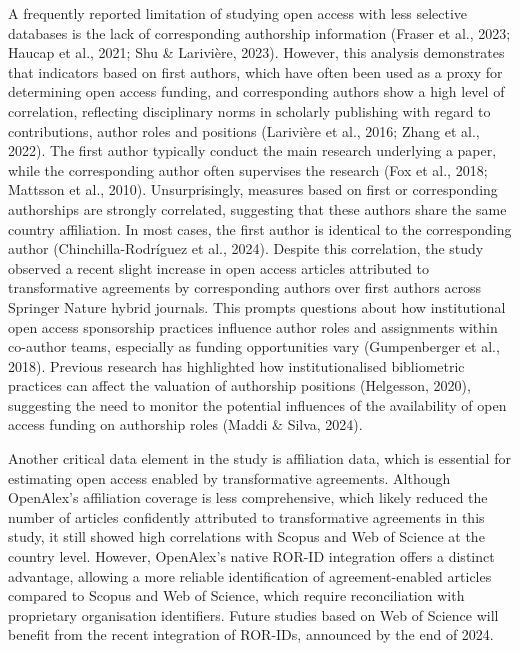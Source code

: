 \documentclass[a4paper,man,floatsintext,longtable,noextraspace,10pt]{apa6}
\begin{document}
A frequently reported limitation of studying open access with less
selective databases is the lack of corresponding authorship information
(Fraser et al., 2023; Haucap et al., 2021; Shu \& Larivière, 2023).
However, this analysis demonstrates that indicators based on first
authors, which have often been used as a proxy for determining open
access funding, and corresponding authors show a high level of
correlation, reflecting disciplinary norms in scholarly publishing with
regard to contributions, author roles and positions (Larivière et al.,
2016; Zhang et al., 2022). The first author typically conduct the main
research underlying a paper, while the corresponding author often
supervises the research (Fox et al., 2018; Mattsson et al., 2010).
Unsurprisingly, measures based on first or corresponding authorships are
strongly correlated, suggesting that these authors share the same
country affiliation. In most cases, the first author is identical to the
corresponding author (Chinchilla-Rodríguez et al., 2024). Despite this
correlation, the study observed a recent slight increase in open access
articles attributed to transformative agreements by corresponding
authors over first authors across Springer Nature hybrid journals. This
prompts questions about how institutional open access sponsorship
practices influence author roles and assignments within co-author teams,
especially as funding opportunities vary (Gumpenberger et al., 2018).
Previous research has highlighted how institutionalised bibliometric
practices can affect the valuation of authorship positions (Helgesson,
2020), suggesting the need to monitor the potential influences of the
availability of open access funding on authorship roles (Maddi \& Silva,
2024).

Another critical data element in the study is affiliation data, which is
essential for estimating open access enabled by transformative
agreements. Although OpenAlex's affiliation coverage is less
comprehensive, which likely reduced the number of articles confidently
attributed to transformative agreements in this study, it still showed
high correlations with Scopus and Web of Science at the country level.
However, OpenAlex's native ROR-ID integration offers a distinct
advantage, allowing a more reliable identification of agreement-enabled
articles compared to Scopus and Web of Science, which require
reconciliation with proprietary organisation identifiers. Future studies
based on Web of Science will benefit from the recent integration of
ROR-IDs, announced by the end of 2024.
\end{document}
